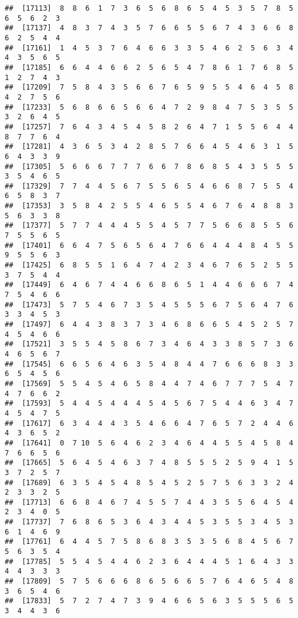 \documentclass[
]{book}
\begin{document}
\begin{verbatim}
##  [17113]  8  8  6  1  7  3  6  5  6  8  6  5  4  5  3  5  7  8  5  6  5  6  2  3
##  [17137]  4  8  3  7  4  3  5  7  6  6  5  5  6  7  4  3  6  6  8  6  2  5  4  4
##  [17161]  1  4  5  3  7  6  4  6  6  3  3  5  4  6  2  5  6  3  4  4  3  5  6  5
##  [17185]  6  6  4  4  6  6  2  5  6  5  4  7  8  6  1  7  6  8  5  1  2  7  4  3
##  [17209]  7  5  8  4  3  5  6  6  7  6  5  9  5  5  4  6  4  5  8  4  2  7  5  6
##  [17233]  5  6  8  6  6  5  6  6  4  7  2  9  8  4  7  5  3  5  5  3  2  6  4  5
##  [17257]  7  6  4  3  4  5  4  5  8  2  6  4  7  1  5  5  6  4  4  8  7  7  6  4
##  [17281]  4  3  6  5  3  4  2  8  5  7  6  6  4  5  4  6  3  1  5  6  4  3  3  9
##  [17305]  5  6  6  6  7  7  7  6  6  7  8  6  8  5  4  3  5  5  5  3  5  4  6  5
##  [17329]  7  7  4  4  5  6  7  5  5  6  5  4  6  6  8  7  5  5  4  6  5  8  3  7
##  [17353]  3  5  8  4  2  5  5  4  6  5  5  4  6  7  6  4  8  8  3  5  6  3  3  8
##  [17377]  5  7  7  4  4  4  5  5  4  5  7  7  5  6  6  8  5  5  6  7  5  5  6  5
##  [17401]  6  6  4  7  5  6  5  6  4  7  6  6  4  4  4  8  4  5  5  9  5  5  6  3
##  [17425]  6  8  5  5  1  6  4  7  4  2  3  4  6  7  6  5  2  5  5  3  7  5  4  4
##  [17449]  6  4  6  7  4  4  6  6  8  6  5  1  4  4  6  6  6  7  4  7  5  4  6  6
##  [17473]  5  7  5  4  6  7  3  5  4  5  5  5  6  7  5  6  4  7  6  3  3  4  5  3
##  [17497]  6  4  4  3  8  3  7  3  4  6  8  6  6  5  4  5  2  5  7  4  5  4  6  6
##  [17521]  3  5  5  4  5  8  6  7  3  4  6  4  3  3  8  5  7  3  6  4  6  5  6  7
##  [17545]  6  6  5  6  4  6  3  5  4  8  4  4  7  6  6  6  8  3  3  6  5  4  5  6
##  [17569]  5  5  4  5  4  6  5  8  4  4  7  4  6  7  7  7  5  4  7  4  7  6  6  2
##  [17593]  5  4  4  5  4  4  4  5  4  5  6  7  5  4  4  6  3  4  7  4  5  4  7  5
##  [17617]  6  3  4  4  4  3  5  4  6  6  4  7  6  5  7  2  4  4  6  4  3  6  5  2
##  [17641]  0  7 10  5  6  4  6  2  3  4  6  4  4  5  5  4  5  8  4  7  6  6  5  6
##  [17665]  5  6  4  5  4  6  3  7  4  8  5  5  5  2  5  9  4  1  5  3  7  2  5  7
##  [17689]  6  3  5  4  5  4  8  5  4  5  2  5  7  5  6  3  3  2  4  2  3  3  2  5
##  [17713]  6  6  8  4  6  7  4  5  5  7  4  4  3  5  5  6  4  5  4  2  3  4  0  5
##  [17737]  7  6  8  6  5  3  6  4  3  4  4  5  3  5  5  3  4  5  3  6  1  4  6  9
##  [17761]  6  4  4  5  7  5  8  6  8  3  5  3  5  6  8  4  5  6  7  5  6  3  5  4
##  [17785]  5  5  4  5  4  4  6  2  3  6  4  4  4  5  1  6  4  3  3  4  4  3  3  3
##  [17809]  5  7  5  6  6  6  8  6  5  6  6  5  7  6  4  6  5  4  8  3  6  5  4  6
##  [17833]  5  7  2  7  4  7  3  9  4  6  6  5  6  3  5  5  5  6  5  3  4  4  3  6

\end{verbatim}
\end{document}
